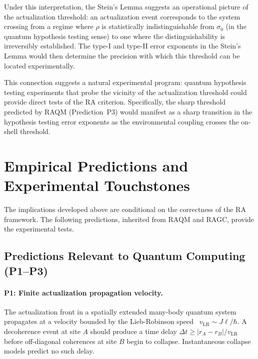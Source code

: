\documentclass[11pt,a4paper]{article}
\theoremstyle{plain}
\theoremstyle{definition}
\theoremstyle{remark}
\begin{document}
Under this interpretation, the Stein's Lemma suggests an operational picture of
the actualization threshold: an actualization event corresponds to the system
crossing from a regime where $\rho$ is statistically indistinguishable from
$\sigma_0$ (in the quantum hypothesis testing sense) to one where the
distinguishability is irreversibly established. The type-I and type-II error
exponents in the Stein's Lemma would then determine the precision with which
this threshold can be located experimentally.

This connection suggests a natural experimental program: quantum hypothesis testing
experiments that probe the vicinity of the actualization threshold could provide
direct tests of the RA criterion. Specifically, the sharp threshold predicted by
RAQM (Prediction~P3) would manifest as a sharp transition in the hypothesis
testing error exponents as the environmental coupling crosses the on-shell
threshold.

\section{Empirical Predictions and Experimental Touchstones}
\label{sec:predictions}

The implications developed above are conditional on the correctness of the RA
framework. The following predictions, inherited from RAQM and RAGC, provide the
experimental tests.

\subsection{Predictions Relevant to Quantum Computing (P1--P3)}

\paragraph{P1: Finite actualization propagation velocity.}
The actualization front in a spatially extended many-body quantum system propagates
at a velocity bounded by the Lieb-Robinson speed~\citep{LiebRobinson1972}
$v_{\mathrm{LR}} \sim J\ell/\hbar$. A decoherence event at site $A$ should
produce a time delay $\Delta t \geq |r_A - r_B|/v_{\mathrm{LR}}$ before
off-diagonal coherences at site $B$ begin to collapse. Instantaneous collapse
models predict no such delay.
\end{document}
